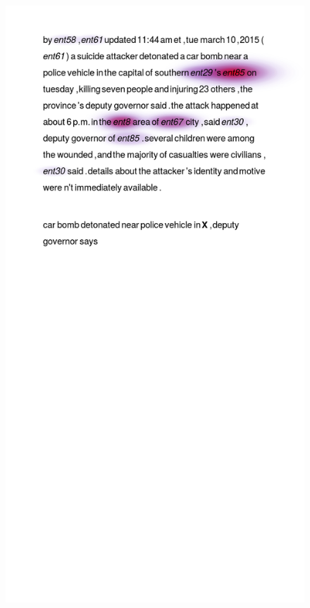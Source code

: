 \begin{figure}[t]
  \centering
  \includegraphics[scale=0.3,clip=true,trim=3cm 32cm 2cm 2cm]{figs/badexamples/1.png}%

\end{figure}
